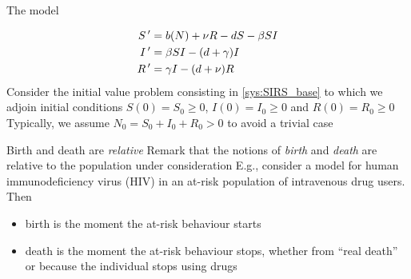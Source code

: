 \documentclass[aspectratio=169]{beamer}\usepackage[]{graphicx}\usepackage[]{xcolor}
\begin{document}
\begin{frame}{The model}
\begin{minipage}{0.25\textwidth}
  \def\skip{*-1.5}
\end{minipage}
\begin{minipage}{0.7\textwidth}
  \begin{subequations} \label{sys:SIRS_base}
  \begin{align}
    S\,' &= b(N)+\nu R-dS-\beta SI \label{sys:SIRS_base_dS} \\
    I\,' &= \beta SI-(d+\gamma) I \label{sys:SIRS_base_dI} \\
    R\,' &= \gamma I-(d+\nu)R \label{sys:SIRS_base_dR}
  \end{align}    
  \end{subequations}
  \vskip1cm
  Consider the initial value problem consisting in \eqref{sys:SIRS_base} to which we adjoin initial conditions $S(0)=S_0\geq 0$, $I(0)=I_0\geq 0$ and $R(0)=R_0\geq 0$
  \vskip1cm
  Typically, we assume $N_0=S_0+I_0+R_0>0$ to avoid a trivial case
  \end{minipage}
\end{frame}

\begin{frame}{Birth and death are \emph{relative}}
  Remark that the notions of \emph{birth} and \emph{death} are relative to the population under consideration
  \vfill
  E.g., consider a model for human immunodeficiency virus (HIV) in an at-risk population of intravenous drug users. Then
  \begin{itemize}
    \item birth is the moment the at-risk behaviour starts 
    \item death is the moment the at-risk behaviour stops,  whether from ``real death'' or because the individual stops using drugs
  \end{itemize}
\end{frame}
\end{document}

